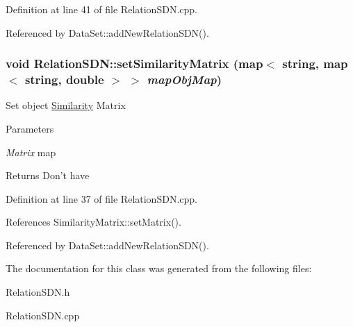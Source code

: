 Definition at line 41 of file RelationSDN.cpp.

Referenced by DataSet::addNewRelationSDN().\hypertarget{classRelationSDN_a3a8936efd1fd9ae0736a4a5e360b34e6}{
\subsubsection[{setSimilarityMatrix}]{\setlength{\rightskip}{0pt plus 5cm}void RelationSDN::setSimilarityMatrix (map$<$ string, map$<$ string, double $>$ $>$ {\em mapObjMap})}}
\label{classRelationSDN_a3a8936efd1fd9ae0736a4a5e360b34e6}
Set object \hyperlink{classSimilarity}{Similarity} Matrix 
\begin{DoxyParams}{Parameters}
\item[{\em Matrix}]map \end{DoxyParams}
\begin{DoxyReturn}{Returns}
Don't have 
\end{DoxyReturn}


Definition at line 37 of file RelationSDN.cpp.

References SimilarityMatrix::setMatrix().

Referenced by DataSet::addNewRelationSDN().

The documentation for this class was generated from the following files:\begin{DoxyCompactItemize}
\item 
RelationSDN.h\item 
RelationSDN.cpp\end{DoxyCompactItemize}
